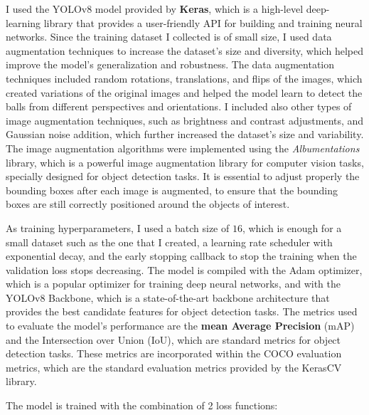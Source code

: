 I used the YOLOv8 model provided by \textbf{Keras}, which is a high-level deep-learning library that provides a user-friendly
API for building and training neural networks. Since the training dataset I collected is of small size,
I used data augmentation techniques to increase the dataset's size and diversity, which helped improve the model's
generalization and robustness. The data augmentation techniques included random rotations, translations, and flips
of the images, which created variations of the original images and helped the model learn to detect the balls
from different perspectives and orientations. I included also other types of image augmentation techniques, such as
brightness and contrast adjustments, and Gaussian noise addition, which further increased the dataset's
size and variability. The image augmentation algorithms were implemented using the \textit{Albumentations} library,
which is a powerful image augmentation library for computer vision tasks, specially designed for 
object detection tasks. It is essential to adjust properly the bounding boxes after each image
is augmented, to ensure that the bounding boxes are still correctly positioned around the objects of interest.

As training hyperparameters, I used a batch size of $16$, which is enough for a small dataset such as the one
that I created, a learning rate scheduler with exponential decay, and the early stopping callback to stop the training
when the validation loss stops decreasing. The model is compiled with the Adam optimizer, which is a popular optimizer
for training deep neural networks, and with the YOLOv8 Backbone, which is a state-of-the-art backbone architecture
that provides the best candidate features for object detection tasks. The metrics used to evaluate the model's performance
are the \textbf{mean Average Precision} (mAP) and the Intersection over Union (IoU),
which are standard metrics for object detection tasks. These metrics are incorporated within the COCO evaluation metrics,
which are the standard evaluation metrics provided by the KerasCV library.

The model is trained with the combination of 2 loss functions:

